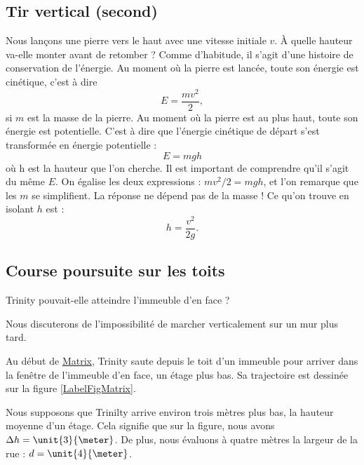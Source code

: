 \documentclass[a4paper,12pt]{book}
\theoremstyle{mes_exemples}	\newtheorem{exemple}[numtho]{Exemple}
\theoremstyle{mes_tho}
\begin{document}
\subsection{Tir vertical (second)}
\label{SubsecTirVecrtical}

Nous lançons une pierre vers le haut avec une vitesse initiale $v$. À quelle hauteur va-elle monter avant de retomber ? Comme d'habitude, il s'agit d'une histoire de conservation de l'énergie. Au moment où la pierre est lancée, toute son énergie est cinétique, c'est à dire
\[ 
  E=\frac{ mv^2 }{ 2 },
\]
si $m$ est la masse de la pierre. Au moment où la pierre est au plus haut, toute son énergie est potentielle. C'est à dire que l'énergie cinétique de départ s'est transformée en énergie potentielle :
\[ 
  E=mgh
\]
 où h est la hauteur que l'on cherche. Il est important de comprendre qu'il s'agit du même $E$. On égalise les deux expressions : $mv^2/2=mgh$, et l'on remarque que les $m$ se simplifient. La réponse ne dépend pas de la masse ! Ce qu'on trouve en isolant $h$ est :
\begin{equation}
h=\frac{ v^2 }{ 2g }.
\end{equation}  

\subsection{Course poursuite sur les toits}

\begin{pourquoidonc}
	Trinity pouvait-elle atteindre l'immeuble d'en face ? 
	
	Nous discuterons de l'impossibilité de marcher verticalement sur un mur plus tard.
\end{pourquoidonc}

Au début de \href{http://fr.wikipedia.org/wiki/Matrix}{Matrix}, Trinity saute depuis le toit d'un immeuble pour arriver dans la fenêtre de l'immeuble d'en face, un étage plus bas. Sa trajectoire est dessinée sur la figure \ref{LabelFigMatrix}.
\newcommand{\CaptionFigMatrix}{La trajectoire suivie par Trinity.}

Nous supposons que Trinilty arrive environ trois mètres plus bas, la hauteur moyenne d'un étage. Cela signifie que sur la figure, nous avons $\Delta h=\unit{3}{\meter}$. De plus, nous évaluons à quatre mètres la largeur de la rue : $d=\unit{4}{\meter}$.
\end{document}
